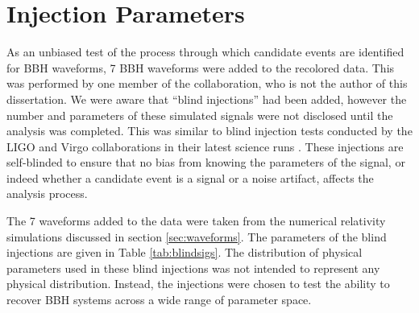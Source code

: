 \section{Injection Parameters}
\label{sec:parameters}

As an unbiased test of the process through which candidate 
events are identified for BBH waveforms, 7 BBH waveforms were added to the 
recolored data. This was performed by one member of the collaboration, who is 
not the author of this dissertation.
We were aware that ``blind injections'' had been
added, however the number and parameters of these simulated signals were not 
disclosed until the analysis was completed. This was similar to blind 
injection tests conducted by the LIGO and Virgo collaborations in their latest 
science runs \cite{Colaboration:2011np}.
These injections are self-blinded to ensure that no bias from knowing the
parameters of the signal, or indeed whether a candidate event is a signal or a 
noise artifact, affects the analysis process.

The 7 waveforms added to the data were taken from the numerical
relativity simulations discussed in section \ref{sec:waveforms}. The parameters
of the blind injections are given in Table \ref{tab:blindsigs}. The distribution
of physical parameters used in these blind injections was not intended to
represent any physical distribution. Instead, the injections were chosen to 
test 
the ability
to recover BBH systems across a wide range of parameter space. 

